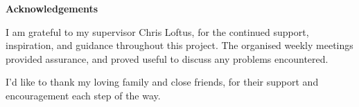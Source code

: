 \thispagestyle{empty}


\begin{center}
    {\LARGE\bf Acknowledgements}
\end{center}

I am grateful to my supervisor Chris Loftus, for the continued support, inspiration, and guidance throughout this project. The organised weekly meetings provided assurance, and proved useful to discuss any problems encountered.

I'd like to thank my loving family and close friends, for their support and encouragement each step of the way. 

